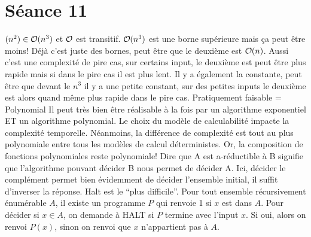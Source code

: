 \section*{Séance 11}

\begin{mcqs}
  {$(n^2) \in \bigO(n^3)$ et $\bigO$ est transitif.}
  {$\bigO(n^{3})$ est une borne supérieure mais ça peut être moins!}
  {Déjà c'est juste des bornes, peut être que le deuxième est $\bigO(n)$.
  Aussi c'est une complexité de pire cas, sur certains input, le deuxième est peut être plus rapide mais si dans le pire cas il est plus lent.
  Il y a également la constante, peut être que devant le $n^3$ il y a une petite constant, sur des petites inputs le deuxième est alors quand même plus rapide dans le pire cas.}
  {Pratiquement faisable = Polynomial}
  {Il peut très bien être réalisable à la fois par un algorithme exponentiel ET un algorithme polynomial.}
  {Le choix du modèle de calculabilité impacte la complexité temporelle. Néanmoins, la différence de complexité est tout au plus polynomiale entre tous les modèles de calcul déterministes. Or, la composition de fonctions polynomiales reste polynomiale!}
  {Dire que A est a-réductible à B signifie que l'algorithme pouvant décider B nous permet de décider A. Ici, décider le complément permet bien évidemment de décider l'ensemble initial, il suffit d'inverser la réponse.}
  {Halt est le ``plus difficile''. Pour tout ensemble récursivement énumérable $A$, il existe un programme $P$ qui renvoie 1 si $x$ est dans $A$. Pour décider si $x \in A$, on demande à HALT si $P$ termine avec l'input $x$. Si oui, alors on renvoi $P(x)$, sinon on renvoi que $x$ n'appartient pas à $A$.}

\end{mcqs}
